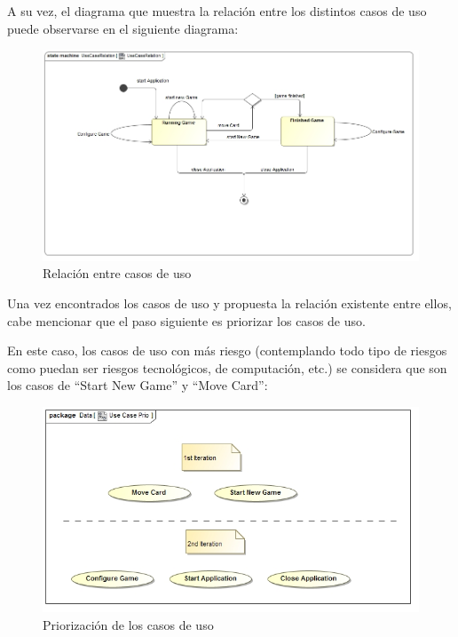 \documentclass[11pt]{article}
\begin{document}
A su vez, el diagrama que muestra la relación entre los distintos casos de uso puede observarse en el siguiente diagrama:

\begin{center}
 \begin{figure}[H]
 \begin{center}
   \includegraphics[width=16cm]{DomainModel/UseCaseRelation01.jpg}
   \caption{Relación entre casos de uso}
   \label{fig:usecaserelation}
 \end{center}
 \end{figure}
\end{center}

Una vez encontrados los casos de uso y propuesta la relación existente entre ellos, cabe mencionar que el paso siguiente es priorizar los casos de uso.

En este caso, los casos de uso con más riesgo (contemplando todo tipo de riesgos como puedan ser riesgos tecnológicos, de computación, etc.) se considera que son los casos de ``Start New Game'' y ``Move Card'':

\begin{center}
 \begin{figure}[H]
 \begin{center}
   \includegraphics[width=15cm]{DomainModel/UseCasePrio02.jpg}
   \caption{Priorización de los casos de uso}
   \label{fig:usecasepriorization}
 \end{center}
 \end{figure}
\end{center}
\end{document}
